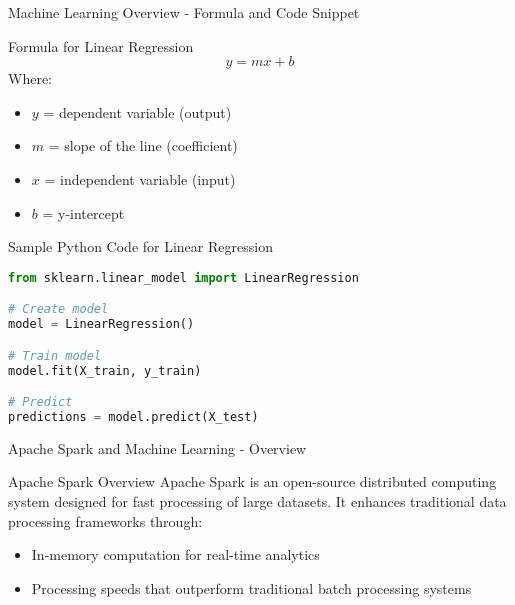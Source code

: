 \documentclass[aspectratio=169]{beamer}
\begin{document}
\begin{frame}[fragile]{Machine Learning Overview - Formula and Code Snippet}
    \begin{block}{Formula for Linear Regression}
        \begin{equation}
            y = mx + b
        \end{equation}
        Where:
        \begin{itemize}
            \item $y$ = dependent variable (output)
            \item $m$ = slope of the line (coefficient)
            \item $x$ = independent variable (input)
            \item $b$ = y-intercept
        \end{itemize}
    \end{block}

    \begin{block}{Sample Python Code for Linear Regression}
        \begin{lstlisting}[language=Python]
from sklearn.linear_model import LinearRegression

# Create model
model = LinearRegression()

# Train model
model.fit(X_train, y_train)

# Predict
predictions = model.predict(X_test)
        \end{lstlisting}
    \end{block}
\end{frame}

\begin{frame}[fragile]{Apache Spark and Machine Learning - Overview}
    \begin{block}{Apache Spark Overview}
        Apache Spark is an open-source distributed computing system designed for fast processing of large datasets. It enhances traditional data processing frameworks through:
        \begin{itemize}
            \item In-memory computation for real-time analytics
            \item Processing speeds that outperform traditional batch processing systems
        \end{itemize}
    \end{block}
\end{frame}
\end{document}
